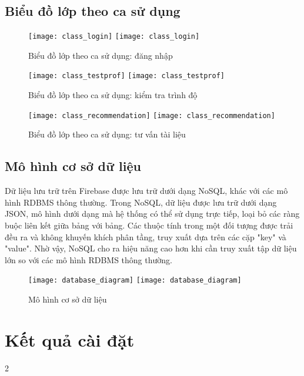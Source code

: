 \subsection{Biểu đồ lớp theo ca sử dụng}

\begin{figure}[H]
  \begin{center}
    \ifpdf
      \texttt{[image: class\_login]}
    \else
      \texttt{[image: class\_login]}
    \fi
    \label{LoginClassDiagram}
    \caption{Biểu đồ lớp theo ca sử dụng: đăng nhập}
  \end{center}
\end{figure}

\begin{figure}[H]
  \begin{center}
    \ifpdf
      \texttt{[image: class\_testprof]}
    \else
      \texttt{[image: class\_testprof]}
    \fi
    \label{TestProficiencyDiagram}
    \caption{Biểu đồ lớp theo ca sử dụng: kiểm tra trình độ}
  \end{center}
\end{figure}

\begin{figure}[H]
  \begin{center}
    \ifpdf
      \texttt{[image: class\_recommendation]}
    \else
      \texttt{[image: class\_recommendation]}
    \fi
    \label{RecommendationDiagram}
    \caption{Biểu đồ lớp theo ca sử dụng: tư vấn tài liệu}
  \end{center}
\end{figure}

\subsection{Mô hình cơ sở dữ liệu}

Dữ liệu lưu trữ trên Firebase được lưu trữ dưới dạng NoSQL, khác với các mô hình RDBMS thông thường. Trong NoSQL, dữ liệu được lưu trữ dưới dạng JSON, mô hình dưới dạng mà hệ thống có thể sử dụng trực tiếp, loại bỏ các ràng buộc liên kết giữa bảng với bảng. Các thuộc tính trong một đối tượng được trải đều ra và không khuyến khích phân tầng, truy xuất dựa trên các cặp "key" và "value". Nhờ vậy, NoSQL cho ra hiệu năng cao hơn khi cần truy xuất tập dữ liệu lớn so với các mô hình RDBMS thông thường.


\begin{figure}[H]
  \begin{center}
    \ifpdf
      \texttt{[image: database\_diagram]}
    \else
      \texttt{[image: database\_diagram]}
    \fi
    \caption{Mô hình cơ sở dữ liệu}
    \label{DatabaseDiagram}
  \end{center}
\end{figure}


\section{Kết quả cài đặt}

2

